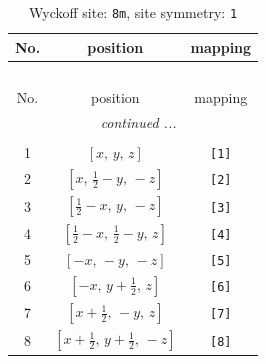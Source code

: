 \documentclass[fleqn,8pt]{jsarticle}
\begin{document}
\renewcommand{\arraystretch}{1.2}
\begin{longtable}{ccc}
\caption{Wyckoff site: {\tt 8m}, site symmetry: {\tt 1}}
 \\
 \hline \hline
No. & position & mapping \\ \hline \endfirsthead

\multicolumn{2}{l}{\tablename\ \thetable{}} \\
 \hline \hline
No. & position & mapping \\ \hline \endhead

 \hline \hline
\multicolumn{2}{r}{\footnotesize\it continued ...} \\ \endfoot

 \hline \hline
\multicolumn{2}{r}{} \\ \endlastfoot

1 & $\left[ x,\, y,\, z \right]$ & {\tt [1]} \\ \hline
2 & $\left[ x,\, \frac{1}{2} - y,\, - z \right]$ & {\tt [2]} \\ \hline
3 & $\left[ \frac{1}{2} - x,\, y,\, - z \right]$ & {\tt [3]} \\ \hline
4 & $\left[ \frac{1}{2} - x,\, \frac{1}{2} - y,\, z \right]$ & {\tt [4]} \\ \hline
5 & $\left[ - x,\, - y,\, - z \right]$ & {\tt [5]} \\ \hline
6 & $\left[ - x,\, y + \frac{1}{2},\, z \right]$ & {\tt [6]} \\ \hline
7 & $\left[ x + \frac{1}{2},\, - y,\, z \right]$ & {\tt [7]} \\ \hline
8 & $\left[ x + \frac{1}{2},\, y + \frac{1}{2},\, - z \right]$ & {\tt [8]} \\
\end{longtable}
\end{document}
